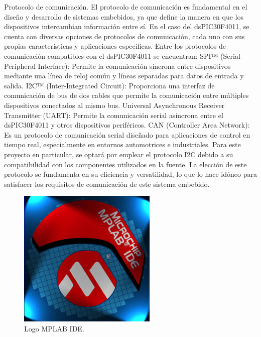 Protocolo de comunicación.
El protocolo de comunicación es fundamental en el diseño y desarrollo de sistemas embebidos, ya que define la manera en que los dispositivos intercambian información entre sí. En el caso del dsPIC30F4011, se cuenta con diversas opciones de protocolos de comunicación, cada uno con sus propias características y aplicaciones específicas.
Entre los protocolos de comunicación compatibles con el dsPIC30F4011 se encuentran:
SPI™ (Serial Peripheral Interface): Permite la comunicación síncrona entre dispositivos mediante una línea de reloj común y líneas separadas para datos de entrada y salida.
I2C™ (Inter-Integrated Circuit): Proporciona una interfaz de comunicación de bus de dos cables que permite la comunicación entre múltiples dispositivos conectados al mismo bus.
Universal Asynchronous Receiver Transmitter (UART): Permite la comunicación serial asíncrona entre el dsPIC30F4011 y otros dispositivos periféricos.
CAN (Controller Area Network): Es un protocolo de comunicación serial diseñado para aplicaciones de control en tiempo real, especialmente en entornos automotrices e industriales.
Para este proyecto en particular, se optará por emplear el protocolo I2C debido a su compatibilidad con los componentes utilizados en la fuente. La elección de este protocolo se fundamenta en su eficiencia y versatilidad, lo que lo hace idóneo para satisfacer los requisitos de comunicación de este sistema embebido.

\begin{figure}[H]
    \centering 
    \includegraphics[scale=0.5]{./imagenes/mplab.jpg}
    \caption{Logo MPLAB IDE.}
    \label{F:LogoMPLAB}
\end{figure}

